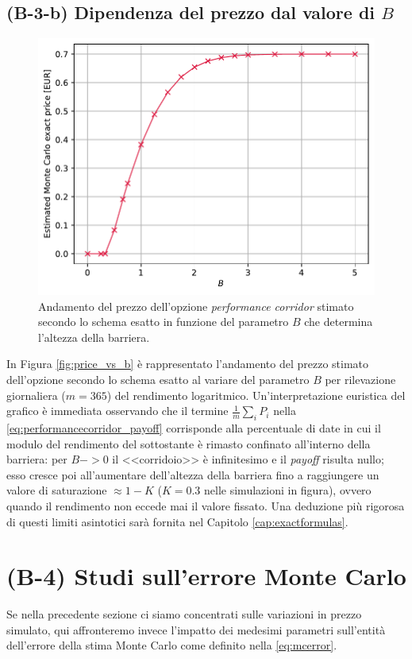 \subsection{(B-3-b) Dipendenza del prezzo dal valore di $B$}

\begin{figure}[t]
    \centering
    \includegraphics[scale=0.5]{graphs/OptionPriceVsB_PriceVsB_N200mln.pdf}
    \caption{Andamento del prezzo dell'opzione \textit{performance corridor} stimato secondo lo schema esatto in funzione del parametro $B$ che determina l'altezza della barriera.}
    \label{fig:price_vs_b}
\end{figure}

In Figura \eqref{fig:price_vs_b} è rappresentato l'andamento del prezzo stimato dell'opzione secondo lo schema esatto al variare del parametro $B$ per rilevazione giornaliera ($m=365$) del rendimento logaritmico. Un'interpretazione euristica del grafico è immediata osservando che il termine $\frac{1}{m} \sum_i P_i$ nella \ref{eq:performancecorridor_payoff} corrisponde alla percentuale di date in cui il modulo del rendimento del sottostante è rimasto confinato all'interno della barriera: per $B -> 0$ il <<corridoio>> è infinitesimo e il \textit{payoff} risulta nullo; esso cresce poi all'aumentare dell'altezza della barriera fino a raggiungere un valore di saturazione $\approx 1-K$ ($K=0.3$ nelle simulazioni in figura), ovvero quando il rendimento non eccede mai il valore fissato. Una deduzione più rigorosa di questi limiti asintotici sarà fornita nel Capitolo \ref{cap:exactformulas}.


\section{(B-4) Studi sull'errore Monte Carlo} \label{sec:errorstudies}
Se nella precedente sezione ci siamo concentrati sulle variazioni in prezzo simulato, qui affronteremo invece l'impatto dei medesimi parametri sull'entità dell'errore della stima Monte Carlo come definito nella \eqref{eq:mcerror}.

